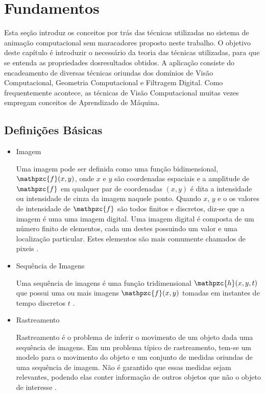 \chapter{Fundamentos\label{chap:FundamentacaoMatematica}}

Esta seção introduz os conceitos por trás das técnicas utilizadas no sistema
de animação computacional sem maracadores proposto neste trabalho. O objetivo deste capítulo 
é introduzir o necessário da teoria das técnicas utilizadas, 
para que se entenda as propriedades dosresultados obtidos. A aplicação 
consiste do encadeamento de diversas técnicas oriundas dos domínios de 
Visão Computacional, Geometria Computacional e Filtragem Digital. Como frequentemente
acontece, as técnicas de Visão Computacional muitas vezes empregam conceitos de 
Aprendizado de Máquina. 


\section{Definições Básicas}

\begin{itemize}
\item Imagem

Uma imagem pode ser definida como uma função bidimensional, $\mathpzc{f}(x,y)$,
onde $x$ e $y$ são coordenadas espaciais e a amplitude de $\mathpzc{f}$ em
qualquer par de coordenadas $(x,y)$ é dita a intensidade ou intensidade de cinza
da imagem naquele ponto. Quando $x$, $y$ e o os valores de intensidade de
$\mathpzc{f}$ são todos finitos e discretos, diz-se que a imagem é uma uma
imagem digital. Uma imagem digital é composta de um número finito de elementos,
cada um destes possuindo um valor e uma localização particular. Estes elementos
são mais comumente chamados de pixeis \cite{gonzalesDigitalImageProc}.

\item Sequência de Imagens

Uma sequência de imagens é uma função tridimensional $\mathpzc{h}(x,y,t)$ que
possui uma ou mais imagens $\mathpzc{f}(x,y)$ tomadas em instantes de tempo
discretos $t$ \cite{def:imageSequence}.

\item Rastreamento

Rastreamento é o problema de inferir o movimento de um objeto dada uma sequência
de imagens. Em um problema típico de rastreamento, tem-se um modelo para o
movimento do objeto e um conjunto de medidas oriundas de uma sequência de
imagem. Não é garantido que essas medidas sejam relevantes, podendo elas conter
informação de outros objetos que não o objeto de interesse
\cite{computer-vision-modern-approach-forsithy}.

\end{itemize}


